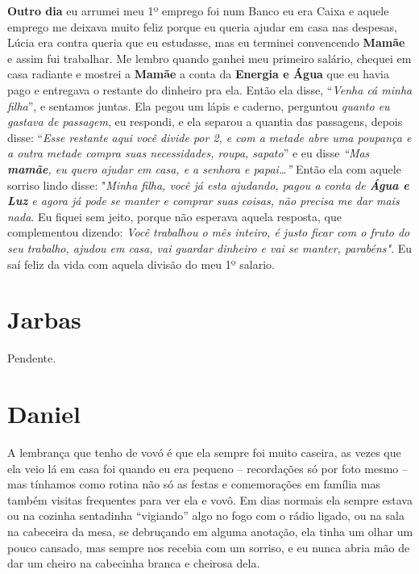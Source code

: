 \documentclass[
  brazil,
  a6paper,
  oneside,
  landscape,
  14pt]{scrbook}
\begin{document}
\textbf{Outro dia} eu arrumei meu 1º emprego foi num Banco eu era Caixa
e aquele emprego me deixava muito feliz porque eu queria ajudar em casa
nas despesas, Lúcia era contra queria que eu estudasse, mas eu terminei
convencendo \textbf{Mamãe} e assim fui trabalhar. Me lembro quando
ganhei meu primeiro salário, chequei em casa radiante e mostrei a
\textbf{Mamãe} a conta da \textbf{Energia e Água} que eu havia pago e
entregava o restante do dinheiro pra ela. Então ela disse, ``\emph{Venha
cá minha filha}'', e sentamos juntas. Ela pegou um lápis e caderno,
perguntou \emph{quanto eu gastava de passagem}, eu respondi, e ela
separou a quantia das passagens, depois disse: ``\emph{Esse restante
aqui você divide por 2, e com a metade abre uma poupança e a outra
metade compra suas necessidades, roupa, sapato}'' e eu disse \emph{``Mas
\textbf{mamãe}, eu quero ajudar em casa, e a senhora e papai\ldots{}''}
Então ela com aquele sorriso lindo disse: "\emph{Minha filha, você já
esta ajudando, pagou a conta de \textbf{Água e Luz} e agora já pode se
manter e comprar suas coisas, não precisa me dar mais nada}. Eu fiquei
sem jeito, porque não esperava aquela resposta, que complementou
dizendo: \emph{Você trabalhou o mês inteiro, é justo ficar com o fruto
do seu trabalho, ajudou em casa, vai guardar dinheiro e vai se manter,
parabéns"}. Eu saí feliz da vida com aquela divisão do meu 1º salario.

\hypertarget{jarbas}{%
\section{Jarbas}\label{jarbas}}

Pendente.

\hypertarget{daniel}{%
\section{Daniel}\label{daniel}}

A lembrança que tenho de vovó é que ela sempre foi muito caseira, as
vezes que ela veio lá em casa foi quando eu era pequeno -- recordações
só por foto mesmo -- mas tínhamos como rotina não só as festas e
comemorações em família mas também visitas frequentes para ver ela e
vovô. Em dias normais ela sempre estava ou na cozinha sentadinha
``vigiando'' algo no fogo com o rádio ligado, ou na sala na cabeceira da
mesa, se debruçando em alguma anotação, ela tinha um olhar um pouco
cansado, mas sempre nos recebia com um sorriso, e eu nunca abria mão de
dar um cheiro na cabecinha branca e cheirosa dela.
\end{document}
